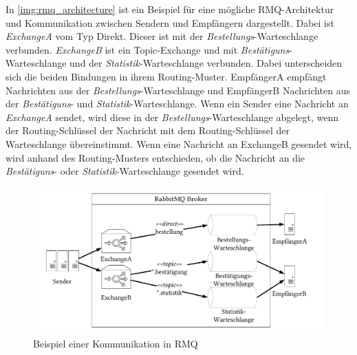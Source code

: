 In \autoref{img:rmq_architecture} ist ein Beispiel für eine mögliche RMQ-Architektur und Kommunikation zwischen Sendern und Empfängern dargestellt. Dabei ist \emph{ExchangeA} vom Typ Direkt. Dieser ist mit der \emph{Bestellungs}-Warteschlange verbunden. \emph{ExchangeB} ist ein Topic-Exchange und mit \emph{Bestätiguns}-Warteschlange und der \emph{Statistik}-Warteschlange verbunden. Dabei unterscheiden sich die beiden Bindungen in ihrem Routing-Muster. EmpfängerA empfängt Nachrichten aus der \emph{Bestellungs}-Warteschlange und EmpfängerB Nachrichten aus der \emph{Bestätiguns}- und \emph{Statistik}-Warteschlange. Wenn ein Sender eine Nachricht an \emph{ExchangeA} sendet, wird diese in der \emph{Bestellungs}-Warteschlange abgelegt, wenn der Routing-Schlüssel der Nachricht mit dem Routing-Schlüssel der Warteschlange übereinstimmt. Wenn eine Nachricht an ExchangeB gesendet wird, wird anhand des Routing-Musters entschieden, ob die Nachricht an die \emph{Bestätiguns}- oder \emph{Statistik}-Warteschlange gesendet wird. 
\begin{figure}
\center
  \includegraphics[width=1\textwidth]{images/measurement/rmqexample.pdf}
  \caption{Beispiel einer Kommunikation in RMQ}
  \label{img:rmq_architecture}
\end{figure}

